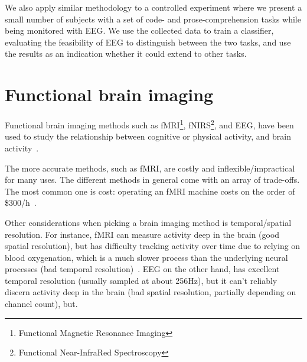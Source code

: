We also apply similar methodology to a controlled experiment where we present a small number of subjects with a set of code- and prose-comprehension tasks while being monitored with EEG\@. We use the collected data to train a classifier, evaluating the feasibility of EEG to distinguish between the two tasks, and use the results as an indication whether it could extend to other tasks.



\section{Functional brain imaging}

    Functional brain imaging methods such as fMRI\footnote{Functional Magnetic Resonance Imaging}, fNIRS\footnote{Functional Near-InfraRed Spectroscopy}, and EEG, have been used to study the relationship between cognitive or physical activity, and brain activity~\cite{floyd_decoding_2017}\cite{hong_classification_2015}\cite{fucci_replication_2019}. 

    The more accurate methods, such as fMRI, are costly and inflexible/impractical for many uses. The different methods in general come with an array of trade-offs. The most common one is cost: operating an fMRI machine costs on the order of \$300/h~\cite{fucci_replication_2019}. 

    Other considerations when picking a brain imaging method is temporal/spatial resolution. For instance, fMRI can measure activity deep in the brain (good spatial resolution), but has difficulty tracking activity over time due to relying on blood oxygenation, which is a much slower process than the underlying neural processes (bad temporal resolution)~\cite{glover_overview_2011}. EEG on the other hand, has excellent temporal resolution (usually sampled at about 256Hz), but it can't reliably discern activity deep in the brain (bad spatial resolution, partially depending on channel count), but.

